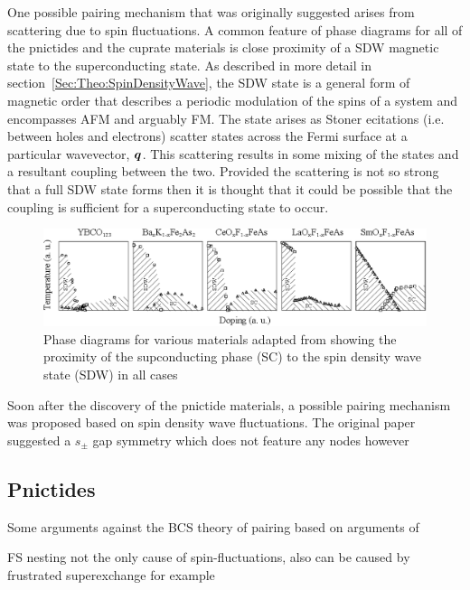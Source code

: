 One possible pairing mechanism that was originally suggested arises from scattering due to spin fluctuations. A common feature of phase diagrams for all of the pnictides and the cuprate materials is close proximity of a \ac{SDW} magnetic state to the superconducting state. As described in more detail in section~\ref{Sec:Theo:SpinDensityWave}, the \ac{SDW} state is a general form of magnetic order that describes a periodic modulation of the spins of a system and encompasses \ac{AFM} and arguably \ac{FM}. The state arises as Stoner ecitations (i.e. between holes and electrons) scatter states across the Fermi surface at a particular wavevector, $\boldsymbol{q}$. This scattering results in some mixing of the states and a resultant coupling between the two. Provided the scattering is not so strong that a full \ac{SDW} state forms then it is thought that it could be possible that the coupling is sufficient for a superconducting state to occur.
\begin{figure}[htbp]
    \begin{center}
        \includegraphics[scale=0.8]{Chapter-Introduction/Figures/PhaseDiagrams/PhaseDiagrams}
        \caption{Phase diagrams for various \highTc materials adapted from \cite{Uemura2009} showing the proximity of the supconducting phase (SC) to the spin density wave state (SDW) in all cases}
        \label{Fig:Theo:PhaseDiagrams}
    \end{center}
\end{figure}
Soon after the discovery of the pnictide materials, a possible pairing mechanism was proposed based on spin density wave fluctuations. The original paper suggested a $s_{\pm}$ gap symmetry which does not feature any nodes however 

\subsection{Pnictides}

Some arguments against the BCS theory of pairing \cite{Haule2008,Yndurain2009,Mazin2008} based on arguments of 

FS nesting not the only cause of spin-fluctuations, also can be caused by frustrated superexchange for example 

